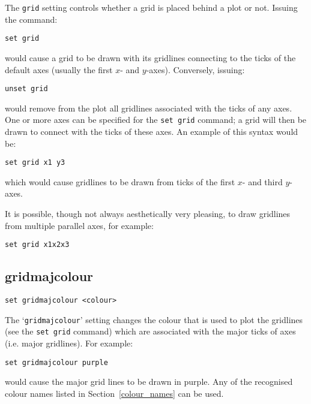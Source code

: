 \documentclass[a4paper,onecolumn,11pt]{book}
\begin{document}
The {\tt grid} setting controls whether a grid is placed behind a plot or not.
Issuing the command:

\begin{verbatim}
set grid
\end{verbatim}

\noindent would cause a grid to be drawn with its gridlines connecting to the ticks of
the default axes (usually the first $x$- and $y$-axes). Conversely, issuing:

\begin{verbatim}
unset grid
\end{verbatim}

\noindent would remove from the plot all gridlines associated with the ticks of any axes.
One or more axes can be specified for the {\tt set grid} command; a grid will
then be drawn to connect with the ticks of these axes. An example of this syntax
would be:

\begin{verbatim}
set grid x1 y3
\end{verbatim}

\noindent which would cause gridlines to be drawn from ticks of the first $x$- and third
$y$-axes.

It is possible, though not always aesthetically very pleasing, to draw
gridlines from multiple parallel axes, for example:

\begin{verbatim}
set grid x1x2x3
\end{verbatim}


\subsection{gridmajcolour}

\begin{verbatim}
set gridmajcolour <colour>
\end{verbatim}

The `{\tt gridmajcolour}' setting changes the colour that is used to plot the
gridlines (see the {\tt set grid} command) which are associated with the major
ticks of axes (i.e. major gridlines). For example:

\begin{verbatim}
set gridmajcolour purple
\end{verbatim}

\noindent would cause the major grid lines to be drawn in purple. Any of the recognised
colour names listed in Section~\ref{colour_names} can be used.
\end{document}
